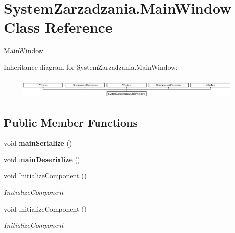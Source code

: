 \hypertarget{class_system_zarzadzania_1_1_main_window}{}\section{System\+Zarzadzania.\+Main\+Window Class Reference}
\label{class_system_zarzadzania_1_1_main_window}


\mbox{\hyperlink{class_system_zarzadzania_1_1_main_window}{Main\+Window}}  


Inheritance diagram for System\+Zarzadzania.\+Main\+Window\+:\begin{figure}[H]
\begin{center}
\leavevmode
\includegraphics[height=1.082126cm]{class_system_zarzadzania_1_1_main_window}
\end{center}
\end{figure}
\subsection*{Public Member Functions}
\begin{DoxyCompactItemize}
\item 
\mbox{\label{class_system_zarzadzania_1_1_main_window_a6814f7b2e20d09335a4aa767b9816263}} 
void {\bfseries main\+Serialize} ()
\item 
\mbox{\label{class_system_zarzadzania_1_1_main_window_a74ba33358d5bc7f200f1e785f023e82b}} 
void {\bfseries main\+Deserialize} ()
\item 
void \mbox{\hyperlink{class_system_zarzadzania_1_1_main_window_a6bf2b1fe2c258d549c389267f9053051}{Initialize\+Component}} ()
\begin{DoxyCompactList}\small\item\em Initialize\+Component \end{DoxyCompactList}\item 
void \mbox{\hyperlink{class_system_zarzadzania_1_1_main_window_a6bf2b1fe2c258d549c389267f9053051}{Initialize\+Component}} ()
\begin{DoxyCompactList}\small\item\em Initialize\+Component \end{DoxyCompactList}\end{DoxyCompactItemize}


